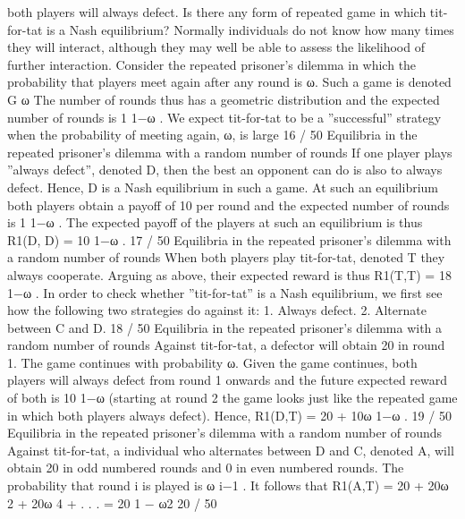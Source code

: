 \documentclass[]{report}
\begin{document}
both players will always defect. Is there any form of repeated game
in which tit-for-tat is a Nash equilibrium?
Normally individuals do not know how many times they will
interact, although they may well be able to assess the likelihood of
further interaction.
Consider the repeated prisoner’s dilemma in which the probability
that players meet again after any round is ω. Such a game is
denoted G
ω
The number of rounds thus has a geometric distribution and the
expected number of rounds is 1
1−ω
. We expect tit-for-tat to be a
”successful” strategy when the probability of meeting again, ω, is
large
16 / 50
Equilibria in the repeated prisoner’s dilemma with a
random number of rounds
If one player plays ”always defect”, denoted D, then the best an
opponent can do is also to always defect.
Hence, D is a Nash equilibrium in such a game.
At such an equilibrium both players obtain a payoff of 10 per round
and the expected number of rounds is 1
1−ω
.
The expected payoff of the players at such an equilibrium is thus
R1(D, D) = 10
1−ω
.
17 / 50
Equilibria in the repeated prisoner’s dilemma with a
random number of rounds
When both players play tit-for-tat, denoted T they always
cooperate.
Arguing as above, their expected reward is thus R1(T,T) = 18
1−ω
.
In order to check whether ”tit-for-tat” is a Nash equilibrium, we
first see how the following two strategies do against it:
1. Always defect.
2. Alternate between C and D.
18 / 50
Equilibria in the repeated prisoner’s dilemma with a
random number of rounds
Against tit-for-tat, a defector will obtain 20 in round 1. The game
continues with probability ω.
Given the game continues, both players will always defect from
round 1 onwards and the future expected reward of both is 10
1−ω
(starting at round 2 the game looks just like the repeated game in
which both players always defect).
Hence, R1(D,T) = 20 + 10ω
1−ω
.
19 / 50
Equilibria in the repeated prisoner’s dilemma with a
random number of rounds
Against tit-for-tat, a individual who alternates between D and C,
denoted A, will obtain 20 in odd numbered rounds and 0 in even
numbered rounds. The probability that round i is played is ω
i−1
.
It follows that
R1(A,T) = 20 + 20ω
2 + 20ω
4 + . . . =
20
1 − ω2
20 / 50
\end{document}

